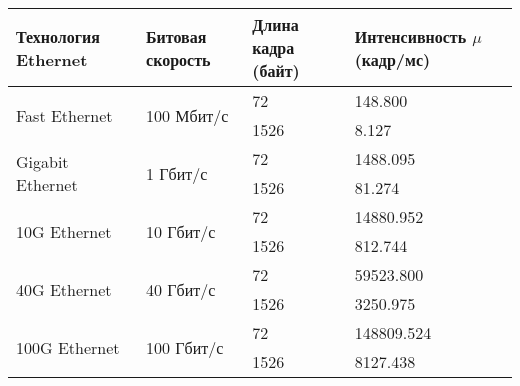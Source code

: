 \documentclass[aspectratio=169]{beamer}
\begin{document}
\begin{frame}
\begin{table}[h!]
	\begin{tabular}{|p{}|p{}|p{}|p{}|}
	\hline Технология Ethernet & Битовая скорость & Длина кадра (байт) & Интенсивность \( \mu \) (кадр/мс) \\
	\hline \multirow{2}{*}{Fast Ethernet} 	& \multirow{2}{*}{100 Мбит/с} 	& 72 	& 148.800 \\
	\hhline{~~--}				  			& \multirow{2}{*}{}           	& 1526 	& 8.127 \\ 
	
	\hline \multirow{2}{*}{Gigabit Ethernet} 	& \multirow{2}{*}{1 Гбит/с} 		& 72 	& 1488.095 \\
	\hhline{~~--}				  			& \multirow{2}{*}{}           	& 1526 	& 81.274 \\ 
	
	\hline \multirow{2}{*}{10G Ethernet} 		& \multirow{2}{*}{10 Гбит/с} 	& 72 	& 14880.952 \\
	\hhline{~~--}				  			& \multirow{2}{*}{}           	& 1526 	& 812.744 \\ 
	
	\hline \multirow{2}{*}{40G Ethernet} 		& \multirow{2}{*}{40 Гбит/с} 	& 72 	& 59523.800 \\
	\hhline{~~--}				  			& \multirow{2}{*}{}           	& 1526 	& 3250.975 \\ 
	
	\hline \multirow{2}{*}{100G Ethernet} 	& \multirow{2}{*}{100 Гбит/с} 	& 72 	& 148809.524 \\
	\hhline{~~--}				  			& \multirow{2}{*}{}           	& 1526 	& 8127.438 \\
	\hline
	\end{tabular}
\end{table}
\end{frame}

%
\end{document}
